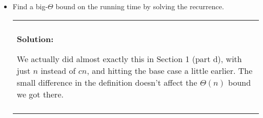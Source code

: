 \documentclass[12pt]{article}
\newenvironment{solution}
	{\begin{center}
	\begin{tabular}{|p{0.9\textwidth}|}
	\hline\\
	\textbf{Solution:}
	}
	{\\\\
	\hline
	\end{tabular}
	\end{center}
	}
\begin{document}
\begin{enumerate}[a)]
\begin{itemize}
\begin{solution}
\[\begin{cases}
				2T(n/3) + cn &\text{ otherwise}
		\end{cases}\]
		Where $c$ is some constant. 
	\end{solution}
	\item Find a big-$\Theta$ bound on the running time by solving the recurrence.
	\begin{solution}
		We actually did almost exactly this in Section 1 (part d), with just $n$ instead of $cn$, and hitting the base case a little earlier. The small difference in the definition doesn't affect the $\Theta(n)$ bound we got there.
	\end{solution}
\end{itemize}
\end{enumerate}
\end{document}
